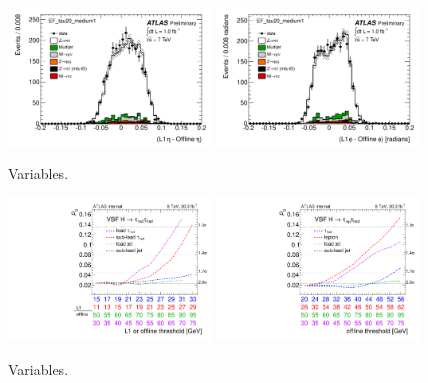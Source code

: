 \begin{figure}[tp]
  \centering
  \includegraphics[width=0.48\textwidth]{figures/ATL-COM-DAQ-2012-001/c_L1_etares}
  \includegraphics[width=0.48\textwidth]{figures/ATL-COM-DAQ-2012-001/c_L1_phires}
  \caption{Variables.}
  \label{fig:prospects-trigger-2011-angular}
\end{figure}

\begin{figure}[tp]
  \centering
  \includegraphics[width=0.48\textwidth]{figures/trigger/evolution_hadhad}
  \includegraphics[width=0.48\textwidth]{figures/trigger/evolution_lephad}
  \caption{Variables.}
  \label{fig:prospects-trigger-evolution}
\end{figure}

